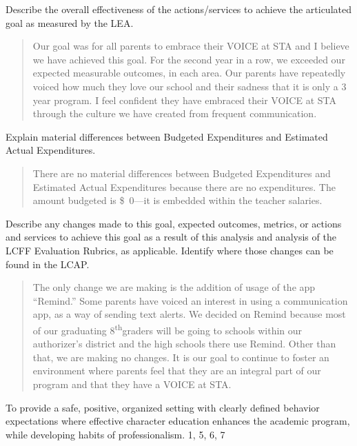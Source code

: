 \documentclass{article}
\renewcommand{\th}{\textsuperscript{th}}
\newcommand{\dollar}[1]{\SI{#1}[\$]{}}
\newcounter{goal}[section] %
\newcounter{action}[goal]
\begin{document}
Describe the overall effectiveness of the actions/services to achieve the articulated goal as measured by the LEA.
\begin{quotation}
	Our goal was for all parents to embrace their VOICE at STA and I believe we have achieved this goal. For the second year in a row, we exceeded our expected measurable outcomes, in each area. Our parents have repeatedly voiced how much they love our school and their sadness that it is only a 3 year program. I feel confident they have embraced their VOICE at STA through the culture we have created from frequent communication.
\end{quotation}

Explain material differences between Budgeted Expenditures and Estimated Actual Expenditures.
\begin{quotation}
	There are no material differences between Budgeted Expenditures and Estimated Actual Expenditures because there are no expenditures. The amount budgeted is \dollar{0}---it is embedded within the teacher salaries.
\end{quotation}

Describe any changes made to this goal, expected outcomes, metrics, or actions and services to achieve this goal as a result of this analysis and analysis of the LCFF Evaluation Rubrics, as applicable. Identify where those changes can be found in the LCAP.
\begin{quotation}
	The only change we are making is the addition of usage of the app ``Remind.'' Some parents have voiced an interest in using a communication app, as a way of sending text alerts. We decided on Remind because most of our graduating 8\th graders will be going to schools within our authorizer's district and the high schools there use Remind. Other than that, we are making no changes. It is our goal to continue to foster an environment where parents feel that they are an integral part of our program and that they have a VOICE at STA.
\end{quotation}

\Goal
	{To provide a safe, positive, organized setting with clearly defined behavior expectations where effective character education enhances the academic program, while developing habits of professionalism.}
	{1, 5, 6, 7}
	{}
\end{document}
